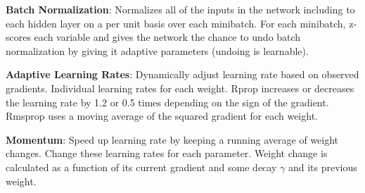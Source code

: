 \textbf{Batch Normalization}: Normalizes all of the inputs in the network including to each hidden layer on a per unit basis over each minibatch. For each minibatch, z-scores each variable and gives the network the chance to undo batch normalization by giving it adaptive parameters (undoing is learnable).

\textbf{Adaptive Learning Rates}: Dynamically adjust learning rate based on observed gradients. Individual learning rates for each weight. Rprop increases or decreases the learning rate by 1.2 or 0.5 times depending on the sign of the gradient. Rmsprop uses a moving average of the squared gradient for each weight. 

\textbf{Momentum}: Speed up learning rate by keeping a running average of weight changes. Change these learning rates for each parameter. Weight change is calculated as a function of its current gradient and some decay $\gamma$ and its previous weight.
